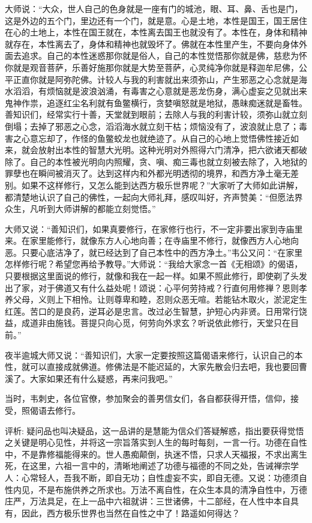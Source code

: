 \documentclass[12pt,twoside,openany]{book}
\newcommand{\kai}[1]{{\CJKfamily{kai}#1}}
\begin{document}
\kai{大师说：“大众，世人自己的色身就是一座有门的城池，眼、耳、鼻、舌也是门，这是外边的五个门，里边还有一个门，就是意。心是土地，本性是国王，国王居住在心的土地上，本性在国王就在，本性离去国王也就没有了。本性在，身体和精神就存在，本性离去了，身体和精神也就毁坏了。佛就在本性里产生，不要向身体外面去追求。自己的本性迷惑那你就是俗人，自己的本性觉悟那你就是佛，慈悲为怀你就是观音菩萨，乐善好施那你就是大势至菩萨，心灵纯净你就是释迦牟尼佛，公平正直你就是阿弥陀佛。计较人与我的利害就出来须弥山，产生邪恶之心念就是海水滔滔，有烦恼就是波浪汹涌，有毒害之心意就是恶龙伤身，满心虚妄之见就出来鬼神作祟，追逐红尘名利就有鱼鳖横行，贪婪嗔怒就是地狱，愚昧痴迷就是畜牲。善知识们，经常实行十善，天堂就到眼前；去除人与我的利害计较，须弥山就立刻倒塌；去掉了邪恶之心念，滔滔海水就立刻干枯；烦恼没有了，波浪就止息了；毒害之心意忘却了，作怪的鱼鳖蛟龙也就绝迹了。从自己的心地上觉悟佛性接近如来，就会放射出本性的智慧大光明。这种光明对外照得六门清净，把六欲诸天都破除了。自己的本性被光明向内照耀，贪、嗔、痴三毒也就立刻被去除了，入地狱的罪孽也在瞬间被消灭了。达到这样内和外都光明透彻的境界，和西方净土毫无差别。如果不这样修行，又怎么能到达西方极乐世界呢？”大家听了大师如此讲解，都清楚地认识了自己的佛性，一起向大师礼拜，感叹叫好，齐声赞美：“但愿法界众生，凡听到大师讲解的都能立刻觉悟。”
	
大师又说：“善知识们，如果真要修行，在家修行也行，不一定非要出家到寺庙里来。在家里能修行，就像东方人心地向善；在寺庙里不修行，就像西方人心地向恶。只要心底洁净了，就已经达到了自己本性中的西方净土。”韦公又问：“在家里怎样修行呢？希望您再给予教导。”大师说：“我给大家念一首《无相颂》的偈语，只要根据这里面说的修行，就像和我在一起一样。如果不照此修行，即使剃了头发出了家，对于佛道又有什么益处呢！颂说：心平何劳持戒？行直何用修禅？恩则孝养父母，义则上下相怜。让则尊卑和睦，忍则众恶无喧。若能钻木取火，淤泥定生红莲。苦口的是良药，逆耳必是忠言。改过必生智慧，护短心内非贤。日用常行饶益，成道非由施钱。菩提只向心觅，何劳向外求玄？听说依此修行，天堂只在目前。”

夜半逾城大师又说：“善知识们，大家一定要按照这篇偈语来修行，认识自己的本性，就可以直接成就佛道。修佛法是不能迟延的，大家先散会归去吧，我也要回曹溪了。大家如果还有什么疑惑，再来问我吧。”

当时，韦刺史，各位官僚，参加聚会的善男信女们，各自都获得开悟，信仰，接受，照偈语去修行。}

\kai{评析: 疑问品也叫决疑品，这一品讲的是慧能为信众们答疑解惑，指出要获得觉悟之关键是明心见性，并将这一宗旨落实到人生的每时每刻，一言一行。功德在自性中，不是靠修福能得来的。世人愚痴颠倒，执迷不悟，只求人天福报，不求出离生死，在这里，六祖一言中的，清晰地阐述了功德与福德的不同之处，告诫禅宗学人：心常轻人，吾我不断，即自无功；自性虚妄不实，即自无德。又说：功德须自性内见，不是布施供养之所求也。万法不离自性，在众生本具的清净自性中，万德庄严，万法具足，在上一品中六祖就讲：三世诸佛，十二部经，在人性中本自具有，因此，西方极乐世界也当然在自性之中了！路遥如何得达？}
\end{document}
